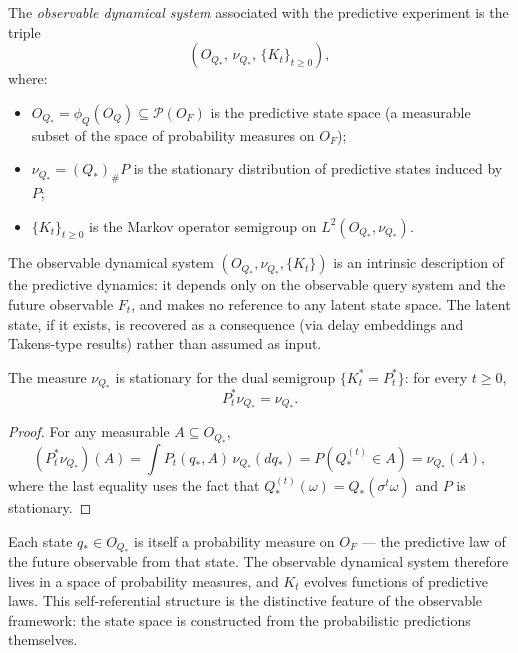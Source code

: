 \begin{definition}\label{def:obs-dyn-sys}
The \emph{observable dynamical system} associated with the predictive
experiment is the triple
\[
(O_{Q_*},\,\nu_{Q_*},\,\{K_t\}_{t\ge0}),
\]
where:
\begin{itemize}
\item $O_{Q_*} = \phi_Q(O_Q) \subseteq \mathcal{P}(O_F)$ is the
  predictive state space (a measurable subset of the space of
  probability measures on $O_F$);
\item $\nu_{Q_*} = (Q_*)_\#P$ is the stationary distribution of
  predictive states induced by $P$;
\item $\{K_t\}_{t\ge0}$ is the Markov operator semigroup on
  $L^2(O_{Q_*},\nu_{Q_*})$.
\end{itemize}
\end{definition}

\begin{remark}
The observable dynamical system $(O_{Q_*},\nu_{Q_*},\{K_t\})$ is an
intrinsic description of the predictive dynamics: it depends only on
the observable query system and the future observable $F_t$, and makes
no reference to any latent state space.  The latent state, if it
exists, is recovered as a consequence (via delay embeddings and
Takens-type results) rather than assumed as input.
\end{remark}

\begin{proposition}
The measure $\nu_{Q_*}$ is stationary for the dual semigroup
$\{K_t^* = P_t^*\}$: for every $t\ge0$,
\[
P_t^*\nu_{Q_*} = \nu_{Q_*}.
\]
\end{proposition}

\begin{proof}
For any measurable $A\subseteq O_{Q_*}$,
\[
(P_t^*\nu_{Q_*})(A)
= \int P_t(q_*,A)\,\nu_{Q_*}(dq_*)
= P(Q_*^{(t)}\in A)
= \nu_{Q_*}(A),
\]
where the last equality uses the fact that $Q_*^{(t)}(\omega)
= Q_*(\sigma^t\omega)$ and $P$ is stationary.
\end{proof}

\begin{remark}
Each state $q_* \in O_{Q_*}$ is itself a probability measure on $O_F$
--- the predictive law of the future observable from that state.  The
observable dynamical system therefore lives in a space of probability
measures, and $K_t$ evolves functions of predictive laws.  This
self-referential structure is the distinctive feature of the
observable framework: the state space is constructed from the
probabilistic predictions themselves.
\end{remark}

